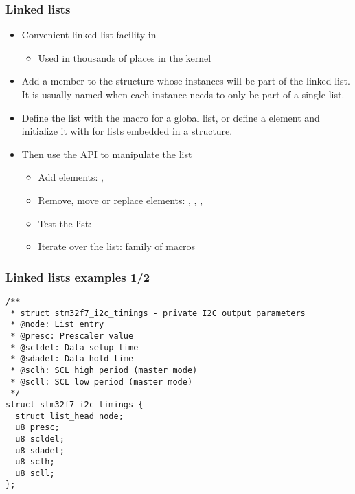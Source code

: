 \begin{frame}
  \frametitle{Linked lists}
  \begin{itemize}
  \item Convenient linked-list facility in 
    \begin{itemize}
    \item Used in thousands of places in the kernel
    \end{itemize}
  \item Add a  member to the structure whose
    instances will be part of the linked list. It is usually named
     when each instance needs to only be part of a single
    list.
  \item Define the list with the  macro for a global
    list, or define a  element and initialize
    it with  for lists embedded in a structure.
  \item Then use the  API to manipulate the list
    \begin{itemize}
    \item Add elements: , 
    \item Remove, move or replace elements: ,
      , ,
    \item Test the list: 
    \item Iterate over the list:  family of macros
    \end{itemize}
  \end{itemize}
\end{frame}

\begin{frame}[fragile]
  \frametitle{Linked lists examples 1/2}
\begin{block}{}
\begin{verbatim}
/**
 * struct stm32f7_i2c_timings - private I2C output parameters
 * @node: List entry
 * @presc: Prescaler value
 * @scldel: Data setup time
 * @sdadel: Data hold time
 * @sclh: SCL high period (master mode)
 * @scll: SCL low period (master mode)
 */
struct stm32f7_i2c_timings {
  struct list_head node;
  u8 presc;
  u8 scldel;
  u8 sdadel;
  u8 sclh;
  u8 scll;
};
\end{verbatim}
\end{block}
\end{frame}

